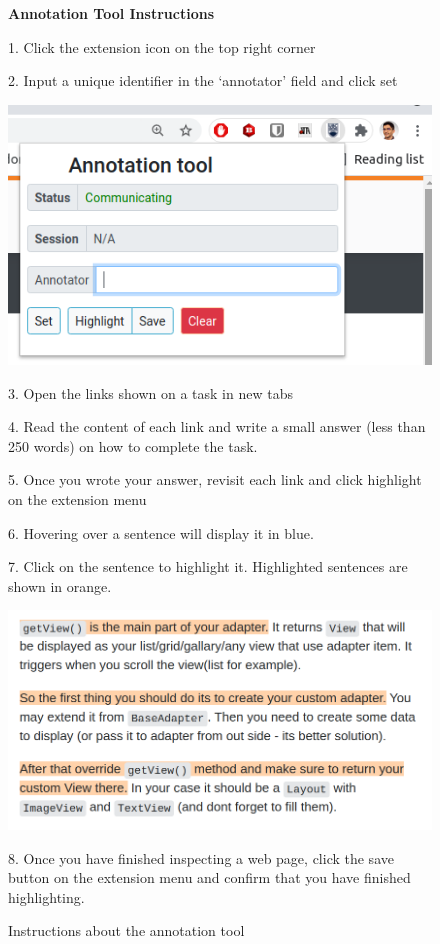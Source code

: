 

\begin{figure}
\begin{mdframed}[backgroundcolor=gray!05] 
\begin{scriptsize}

{\large \textbf{Annotation Tool Instructions}} \bigskip


1. Click the extension icon on the top right corner \smallskip

2. Input a unique identifier in the `annotator' field and click set \smallskip


\begin{center}
    \includegraphics[width=.45\textwidth]{appendix/cp4/fig/annotation-tool.png} \smallskip
\end{center}

3. Open the links shown on a task in new tabs \smallskip

4. Read the content of each link and write a small answer (less than 250 words) on how to complete the task. \smallskip

5. Once you wrote your answer, revisit each link and click highlight on the extension menu \smallskip

6. Hovering over a sentence will display it in blue. \smallskip


7. Click on the sentence to highlight it. Highlighted sentences are shown in orange. \smallskip


\begin{center}
    \includegraphics[width=.65\textwidth]{appendix/cp4/fig/highlight-orange.png} \smallskip
\end{center}


8. Once you have finished inspecting a web page, click the save button on the extension menu and confirm that you have finished highlighting.

\end{scriptsize}
\end{mdframed}
\caption{Instructions about the annotation tool}
\end{figure}

